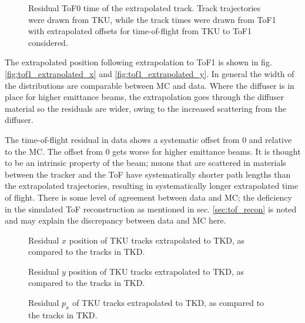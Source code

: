 \begin{figure}[!tbh]
    \centering
    {Residual ToF0 time of the extrapolated track. Track trajectories were drawn from TKU, while the track times were
    drawn from ToF1 with extrapolated offsets for time-of-flight from TKU to ToF1 considered. \label{fig:tof0_extrapolated_t}}
\end{figure}

The extrapolated position following extrapolation to ToF1 is shown in fig.
\ref{fig:tof1_extrapolated_x} and \ref{fig:tof1_extrapolated_y}. In general the width 
of the distributions are comparable between MC and data. Where the diffuser is in
place for higher emittance beams, the extrapolation goes through the diffuser
material so the residuals are wider, owing to the increased scattering from the
diffuser.

The time-of-flight residual in data shows a systematic offset from 0 and relative to the
MC. The offset from 0 gets worse for higher emittance beams. It is thought to be
an intrinsic property of the beam; muons that are scattered in materials between 
the tracker and the ToF have systematically shorter path lengths than the 
extrapolated trajectories, resulting in systematically longer extrapolated time
of flight. There is some level of agreement between data and MC; the deficiency
in the simulated ToF reconstruction as mentioned in sec. \ref{sec:tof_recon} 
is noted and may explain the discrepancy between data and MC here.

\begin{figure}[!tbh]
    \centering
    {Residual $x$ position of TKU tracks extrapolated to TKD, as compared to the tracks in TKD. \label{fig:tkd_extrapolated_x}}
\end{figure}

\begin{figure}[!tbh]
    \centering
    {Residual $y$ position of TKU tracks extrapolated to TKD, as compared to the tracks in TKD. \label{fig:tkd_extrapolated_y}}
\end{figure}

\begin{figure}[!tbh]
    \centering
    {Residual $p_x$ of TKU tracks extrapolated to TKD, as compared to the tracks in TKD. \label{fig:tkd_extrapolated_px}}
\end{figure}

